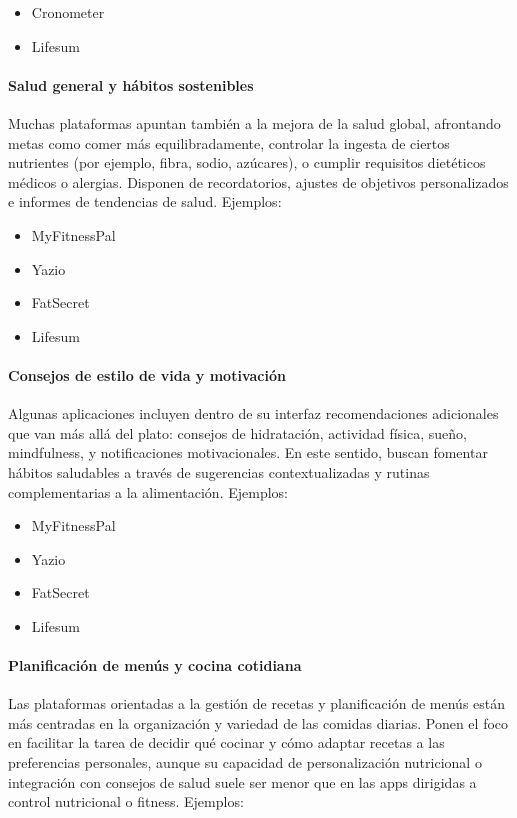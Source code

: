 \begin{itemize}
	\item Cronometer
	\item Lifesum
\end{itemize}

\paragraph*{Salud general y hábitos sostenibles}
Muchas plataformas apuntan también a la mejora de la salud global, afrontando metas como comer más equilibradamente, controlar la ingesta de ciertos nutrientes (por ejemplo, fibra, sodio, azúcares), o cumplir requisitos dietéticos médicos o alergias. Disponen de recordatorios, ajustes de objetivos personalizados e informes de tendencias de salud. Ejemplos:

\begin{itemize}
	\item MyFitnessPal
	\item Yazio
	\item FatSecret
	\item Lifesum
\end{itemize}

\paragraph*{Consejos de estilo de vida y motivación}
Algunas aplicaciones incluyen dentro de su interfaz recomendaciones adicionales que van más allá del plato: consejos de hidratación, actividad física, sueño, mindfulness, y notificaciones motivacionales. En este sentido, buscan fomentar hábitos saludables a través de sugerencias contextualizadas y rutinas complementarias a la alimentación. Ejemplos:

\begin{itemize}
	\item MyFitnessPal
	\item Yazio
	\item FatSecret
	\item Lifesum
\end{itemize}

\paragraph*{Planificación de menús y cocina cotidiana}
Las plataformas orientadas a la gestión de recetas y planificación de menús están más centradas en la organización y variedad de las comidas diarias. Ponen el foco en facilitar la tarea de decidir qué cocinar y cómo adaptar recetas a las preferencias personales, aunque su capacidad de personalización nutricional o integración con consejos de salud suele ser menor que en las apps dirigidas a control nutricional o fitness. Ejemplos:

